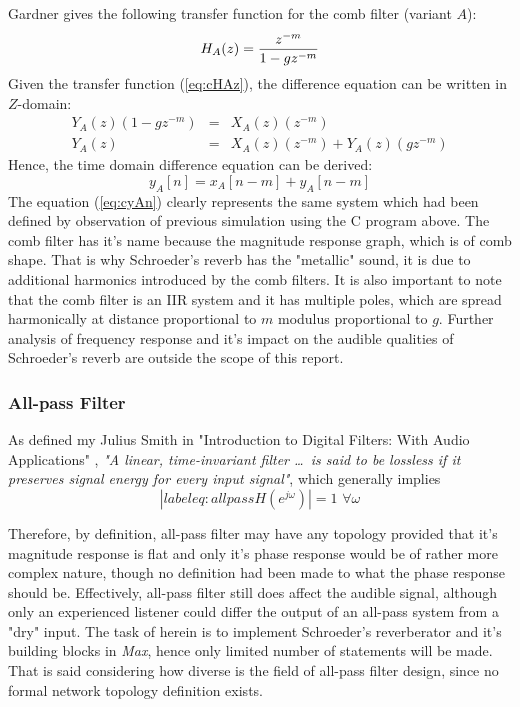 \documentclass[12pt]{report}
\begin{document}
  

  Gardner \cite{gardner1998algorithms} gives the following transfer function
  for the comb filter (variant $A$):\begin{equation}\label{eq:cHAz}
    H_A(z)={{z^{-m}}\over{1-gz^{-m}}}
  \end{equation}
  Given the transfer function (\ref{eq:cHAz}), the difference equation can be
  written in $Z$-domain:\begin{eqnarray}
    Y_A(z)(1-gz^{-m}) &=& X_A(z)(z^{-m})\\
    Y_A(z) &=& X_A(z)(z^{-m}) + Y_A(z)(gz^{-m})
  \end{eqnarray}
  Hence, the time domain difference equation can be derived:
  \begin{equation}\label{eq:cyAn}
    y_A[n] = x_A[n-m] + y_A[n-m]
  \end{equation}
  The equation (\ref{eq:cyAn}) clearly represents the same system which had been
  defined by observation of previous simulation using the C program above.
  The comb filter has it's name because the magnitude response graph, which is
  of comb shape. That is why Schroeder's reverb has the "metallic" sound, it
  is due to additional harmonics introduced by the comb filters. It is also
  important to note that the comb filter is an IIR system and it has multiple
  poles, which are spread harmonically at distance proportional to $m$ modulus
  proportional to $g$. Further analysis of frequency response and it's impact
  on the audible qualities of Schroeder's reverb are outside the scope of this
  report.

  \subsubsection{All-pass Filter}
  As defined my Julius Smith in "Introduction to Digital Filters: With Audio
  Applications" \cite{smith2007introduction}, \emph{"A linear, time-invariant
  filter \dots\ is said to be lossless if it preserves signal energy for every
  input signal"}, which generally implies \begin{equation}|label{eq:allpass}
    H(e^{j\omega})|=1\,\,\forall\omega \end{equation}

  Therefore, by definition, all-pass filter may have any topology provided
  that it's magnitude response is flat and only it's phase response would
  be of rather more complex nature, though no definition had been made to
  what the phase response should be. Effectively, all-pass filter still
  does affect the audible signal, although only an experienced listener
  could differ the output of an all-pass system from a "dry" input. The
  task of herein is to implement Schroeder's reverberator and it's building
  blocks in \emph{Max}, hence only limited number of statements will be made.
  That is said considering how diverse is the field of all-pass filter design,
  since no formal network topology definition exists.
\end{document}
